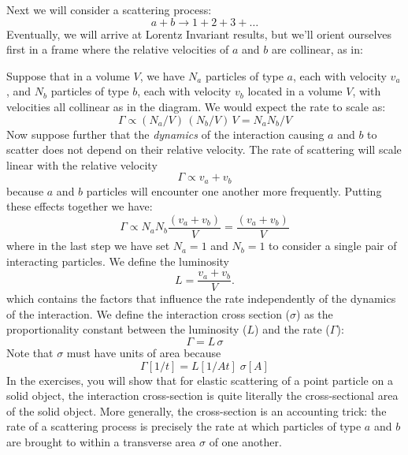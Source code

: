 \documentclass[12pt]{article}
\begin{document}
Next we will consider a scattering process:
$$a + b \to 1 + 2 + 3 + \ldots$$
Eventually, we will arrive at Lorentz Invariant results, but we'll orient ourselves first in a frame where the relative velocities of $a$ and $b$ are collinear, as in:
\begin{center}
\end{center}
Suppose that in a volume $V$, we have $N_a$ particles of type $a$,
each with velocity $v_a$, and $N_b$ particles of type $b$, each with
velocity $v_b$ located in a volume $V$, with velocities all collinear
as in the diagram.  We would expect the rate to scale as:
$$\Gamma \propto (N_a/V)\,(N_b/V)\,V = N_a N_b / V$$ Now suppose
further that the {\it dynamics} of the interaction causing $a$ and $b$
to scatter does not depend on their relative velocity.  The rate of
scattering will scale linear with the relative velocity
$$\Gamma \propto v_a + v_b$$
because $a$ and $b$ particles will encounter one another more frequently.
Putting these effects together we have:
$$\Gamma \propto N_a N_b \frac{(v_a + v_b)}{V} = \frac{(v_a + v_b)}{V}$$
where in the last step we have set $N_a=1$ and $N_b=1$ to consider a single pair of interacting particles.  We define the luminosity
\begin{equation}
\label{eqn:lumi}
L = \frac{v_a + v_b}{V}.
\end{equation}
which contains the factors that influence the rate independently of the dynamics of the interaction.  We define the interaction cross section ($\sigma$) as the proportionality constant between the luminosity ($L$) and the rate ($\Gamma$):
\begin{equation}
\label{eqn:rate-sigma}
\Gamma = L \, \sigma
\end{equation}
Note that $\sigma$ must have units of area because
$$\Gamma[1/t] = L[1/At] \; \sigma[A]$$
In the exercises, you will show that for elastic scattering of a point
particle on a solid object, the interaction cross-section is quite
literally the cross-sectional area of the solid object.  More
generally, the cross-section is an accounting trick: the rate of a
scattering process is precisely the rate at which particles of type
$a$ and $b$ are brought to within a transverse area $\sigma$ of one
another.
\end{document}
